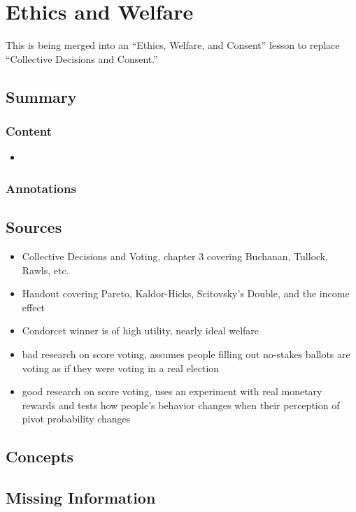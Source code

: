 \chapter{Ethics and Welfare}

This is being merged into an ``Ethics, Welfare, and Consent'' lesson to replace ``Collective Decisions and Consent.''

\section{Summary}


\subsection{Content}

\begin{itemize}
    \item
\end{itemize}

\subsection{Annotations}

\section{Sources}

\begin{itemize}
    \item Collective Decisions and Voting, chapter 3 \autocite[23-32]{Tideman2006} covering Buchanan, Tullock, Rawls, etc.
    \item Handout covering Pareto, Kaldor-Hicks, Scitovsky's Double, and the income effect
    \item \autocite{GreenArmytage2015} Condorcet winner is of high utility, nearly ideal welfare
    \item \autocite{Baujard2014} bad research on score voting, assumes people filling out no-stakes ballots are voting as if they were voting in a real election
    \item \autocite{Feddersen2009} good research on score voting, uses an experiment with real monetary rewards and tests how people's behavior changes when their perception of pivot probability changes
\end{itemize}

\section{Concepts}

\section{Missing Information}

